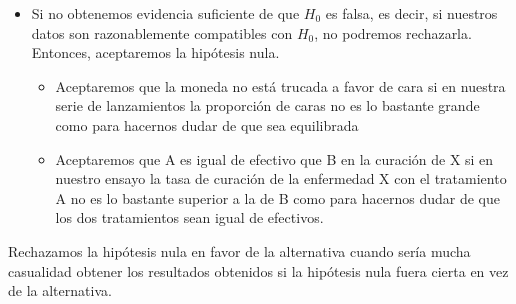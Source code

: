\documentclass[
  spanish,
  letterpaper,
  DIV=11,
  numbers=noendperiod]{scrreprt}
\begin{document}
\begin{itemize}
  \begin{itemize}
  \item
    Tendremos evidencia de que la moneda está trucada a favor de cara si
    en nuestra serie de lanzamientos la proporción de caras es tan
    grande que se nos hace muy difícil creer que la moneda sea
    equilibrada.
  \item
    Tendremos evidencia de que A es más efectivo que B en la curación de
    X si en nuestro ensayo la tasa de curación de la enfermedad X con el
    tratamiento A es tan superior a la de B que se nos hace muy difícil
    creer que los dos tratamientos tengan la misma efectividad.
  \end{itemize}
\item
  Si no obtenemos evidencia suficiente de que \(H_0\) es falsa, es
  decir, si nuestros datos son razonablemente compatibles con \(H_0\),
  no podremos rechazarla. Entonces, aceptaremos la hipótesis nula.

  \begin{itemize}
  \item
    Aceptaremos que la moneda no está trucada a favor de cara si en
    nuestra serie de lanzamientos la proporción de caras no es lo
    bastante grande como para hacernos dudar de que sea equilibrada
  \item
    Aceptaremos que A es igual de efectivo que B en la curación de X si
    en nuestro ensayo la tasa de curación de la enfermedad X con el
    tratamiento A no es lo bastante superior a la de B como para
    hacernos dudar de que los dos tratamientos sean igual de efectivos.
  \end{itemize}
\end{itemize}

\begin{tcolorbox}[enhanced jigsaw, arc=.35mm, bottomrule=.15mm, bottomtitle=1mm, breakable, colback=white, colbacktitle=quarto-callout-important-color!10!white, colframe=quarto-callout-important-color-frame, coltitle=black, left=2mm, leftrule=.75mm, opacityback=0, opacitybacktitle=0.6, rightrule=.15mm, title=\textcolor{quarto-callout-important-color}{\faExclamation}\hspace{0.5em}{Importante}, titlerule=0mm, toprule=.15mm, toptitle=1mm]

Rechazamos la hipótesis nula en favor de la alternativa cuando sería
mucha casualidad obtener los resultados obtenidos si la hipótesis nula
fuera cierta en vez de la alternativa.

\end{tcolorbox}
\end{document}
